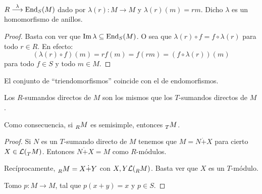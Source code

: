 \begin{lema}
  \(R\overset{\lambda}{\longrightarrow} \operatorname{End}_S(M)\) dado por
  \(\lambda(r):M\longrightarrow M\) y \(\lambda(r)(m)=rm\).
  Dicho \(\lambda\) es un homomorfismo de anillos.
\end{lema}
\begin{proof}
  Basta con ver que \(\Im\lambda\subseteq\operatorname{End}_S(M)\). O sea que
  \(\lambda(r)\circ f=f\circ\lambda(r)\) para todo \(r\in R\).
  En efecto:
  \[
    (\lambda(r)\circ f)(m)=rf(m)=f(rm)=(f\circ\lambda(r))(m)
  \]
  para todo \(f\in S\) y todo \(m \in M\).
\end{proof}
\begin{obs}
  El conjunto de ``triendomorfismos'' coincide con el de endomorfismos.
\end{obs}
\begin{prop}
  Los \(R\)-sumandos directos de \(M\) son los mismos que los \(T\)-sumandos
  directos de \(M\).

  Como consecuencia, si \(\prescript{}{R}{M}\) es semisimple, entonces
  \(\prescript{}{T}{M}\).
\end{prop}
\begin{proof}
  Si \(N\) es un \(T\)-sumando directo de \(M\) tenemos que
  \(M=N\dot{+}X\) para cierto \(X\in\mathcal{L}(\prescript{}{T}{M})\).
  Entonces \(N\dot{+}X=M\) como \(R\)-módulos.

  Recíprocamente, \(\prescript{}{R}{M}=X\dot{+}Y\) con \(X,Y\mathcal{L}
  (\prescript{}{R}{M})\). Basta ver que \(X\) es un \(T\)-módulo.

  Tomo \(p:M\longrightarrow M\), tal que \(p(x+y)=x\) y \(p\in S\).
\end{proof}


